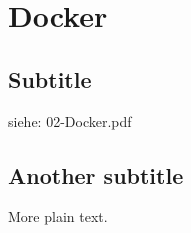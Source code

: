 \section{Docker}

\subsection{Subtitle}

siehe: 02-Docker.pdf

\subsection{Another subtitle}

More plain text.
